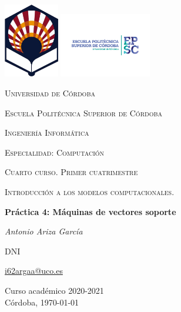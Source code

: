 \begin{titlepage}
\centering
\includegraphics[width=0.18\textwidth]{img/logo_uco_sin_texto.png}
\includegraphics[width=0.30\textwidth]{img/logo_uco_epsc.png}\par\vspace{1cm}
{\scshape\LARGE Universidad de Córdoba\par}
{\scshape\Large Escuela Politécnica Superior de Córdoba\par}
\vspace{1cm}
{\scshape\LARGE Ingeniería Informática\par}
{\scshape\Large Especialidad: Computación\par}
{\scshape\Large Cuarto curso. Primer cuatrimestre\par}
\vspace{1.5cm}
{\scshape\LARGE Introducción a los modelos computacionales.\par}
\vspace{1.5cm}
{\huge\bfseries Práctica 4: Máquinas de vectores soporte\par}
\vspace{1.2cm}
{\Large\itshape Antonio Ariza García\par}
DNI\par
\href{mailto:correo@uco.es}{i62argaa@uco.es}\par
\vfill

{\large Curso académico 2020-2021\\Córdoba, \today\par}
\end{titlepage}